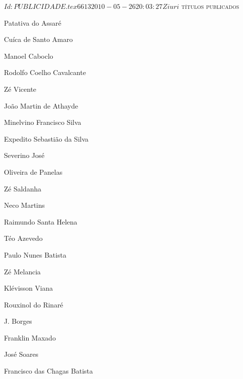 \SVN $Id: PUBLICIDADE.tex 6613 2010-05-26 20:03:27Z iuri $ 
\pagebreak
\pagestyle{empty}
\textsc{títulos publicados}
\begin{enumerate}
\setlength\itemsep{0.1mm}
{
\def\normalsize{\fontsize{7}{7}\selectfont}\normalsize
\item Patativa do Assaré
\item Cuíca de Santo Amaro
\item Manoel Caboclo
\item Rodolfo Coelho Cavalcante
\item Zé Vicente
\item João Martin de Athayde
\item Minelvino Francisco Silva
\item Expedito Sebastião da Silva
\item Severino José
\item Oliveira de Panelas
\item Zé Saldanha
\item Neco Martins
\item Raimundo Santa Helena
\item Téo Azevedo
\item Paulo Nunes Batista
\item Zé Melancia
\item Klévisson Viana
\item Rouxinol do Rinaré
\item J. Borges
\item Franklin Maxado
\item José Soares
\item Francisco das Chagas Batista
\vfill
}%
\end{enumerate}

